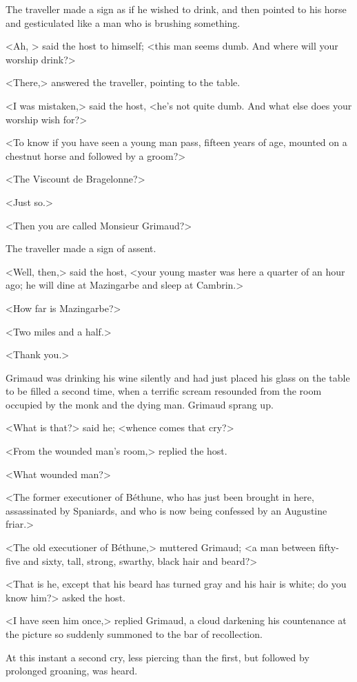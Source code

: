 The traveller made a sign as if he wished to drink, and then pointed to his horse and gesticulated like a man who is brushing something.

<Ah, > said the host to himself; <this man seems dumb. And where will your worship drink?>

<There,> answered the traveller, pointing to the table.

<I was mistaken,> said the host, <he's not quite dumb. And what else does your worship wish for?>

<To know if you have seen a young man pass, fifteen years of age, mounted on a chestnut horse and followed by a groom?>

<The Viscount de Bragelonne?>

<Just so.>

<Then you are called Monsieur Grimaud?>

The traveller made a sign of assent.

<Well, then,> said the host, <your young master was here a quarter of an hour ago; he will dine at Mazingarbe and sleep at Cambrin.>

<How far is Mazingarbe?>

<Two miles and a half.>

<Thank you.>

Grimaud was drinking his wine silently and had just placed his glass on the table to be filled a second time, when a terrific scream resounded from the room occupied by the monk and the dying man. Grimaud sprang up.

<What is that?> said he; <whence comes that cry?>

<From the wounded man's room,> replied the host.

<What wounded man?>

<The former executioner of Béthune, who has just been brought in here, assassinated by Spaniards, and who is now being confessed by an Augustine friar.>

<The old executioner of Béthune,> muttered Grimaud; <a man between fifty-five and sixty, tall, strong, swarthy, black hair and beard?>

<That is he, except that his beard has turned gray and his hair is white; do you know him?> asked the host.

<I have seen him once,> replied Grimaud, a cloud darkening his countenance at the picture so suddenly summoned to the bar of recollection.

At this instant a second cry, less piercing than the first, but followed by prolonged groaning, was heard.

